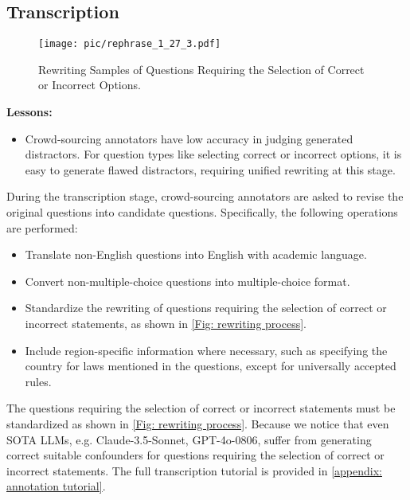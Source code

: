 \subsection{Transcription}
\label{Sec: Transcription}

\begin{figure*}[ht]
\begin{center}
\texttt{[image: pic/rephrase\_1\_27\_3.pdf]}
\end{center}
\caption{Rewriting Samples of Questions Requiring the Selection of Correct or Incorrect Options.}
\label{Fig: rewriting process}
\end{figure*}

\begin{tcolorbox}[colframe=boxcolor,colback=white,boxrule=0.5mm,arc=0mm]
{\Large \textcolor{bulbcolor}{\faLightbulbO}}  \textbf{Lessons:}
\begin{itemize}
    \item Crowd-sourcing annotators have low accuracy in judging generated distractors. For question types like selecting correct or incorrect options, it is easy to generate flawed distractors, requiring unified rewriting at this stage.
\end{itemize}
\end{tcolorbox}
During the transcription stage, crowd-sourcing annotators are asked to revise the original questions into candidate questions.
Specifically,  the following operations are performed:
\begin{itemize}
    \item Translate non-English questions into English with academic language.
    \item Convert non-multiple-choice questions into multiple-choice format.
    \item Standardize the rewriting of questions requiring the selection of correct or incorrect statements, as shown in \autoref{Fig: rewriting process}.
    \item Include region-specific information where necessary, such as specifying the country for laws mentioned in the questions, except for universally accepted rules.
\end{itemize}
The questions requiring the selection of correct or incorrect statements must be standardized as shown in \autoref{Fig: rewriting process}.
Because we notice that even SOTA LLMs, e.g. Claude-3.5-Sonnet, GPT-4o-0806, suffer from generating correct suitable confounders for questions requiring the selection of correct or incorrect statements.
The full transcription tutorial is provided in \autoref{appendix: annotation tutorial}.


